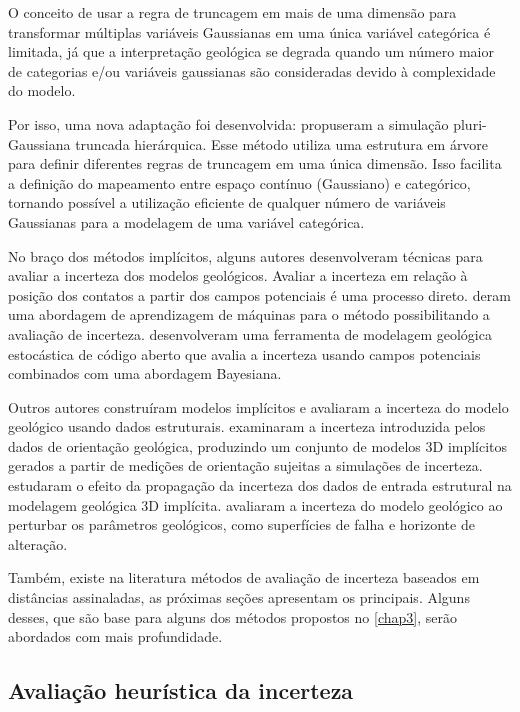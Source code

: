 O conceito de usar a regra de truncagem em mais de uma dimensão para transformar múltiplas variáveis Gaussianas em uma única variável categórica é limitada, já que a interpretação geológica se degrada quando um número maior de categorias e/ou variáveis gaussianas são consideradas devido à complexidade do modelo.

Por isso, uma nova adaptação foi desenvolvida:  propuseram a simulação pluri-Gaussiana truncada hierárquica. Esse método utiliza uma estrutura em árvore para definir diferentes regras de truncagem em uma única dimensão. Isso facilita a definição do mapeamento entre espaço contínuo (Gaussiano) e categórico, tornando possível a utilização eficiente de qualquer número de variáveis Gaussianas para a modelagem de uma variável categórica.

No braço dos métodos implícitos, alguns autores desenvolveram técnicas para avaliar a incerteza dos modelos geológicos. Avaliar a incerteza em relação à posição dos contatos a partir dos campos potenciais é uma  processo direto.  deram uma abordagem de aprendizagem de máquinas para o método possibilitando a avaliação de incerteza.  desenvolveram uma ferramenta de modelagem geológica estocástica de código aberto que avalia a incerteza usando campos potenciais combinados com uma abordagem Bayesiana.

Outros autores construíram modelos implícitos e avaliaram a incerteza do modelo geológico usando dados estruturais.  examinaram a incerteza introduzida pelos dados de orientação geológica, produzindo um conjunto de modelos 3D implícitos gerados a partir de medições de orientação sujeitas a simulações de incerteza.  estudaram o efeito da propagação da incerteza dos dados de entrada estrutural na modelagem geológica 3D implícita.  avaliaram a incerteza do modelo geológico ao perturbar os parâmetros geológicos, como superfícies de falha e horizonte de alteração.

Também, existe na literatura métodos de avaliação de incerteza baseados em distâncias assinaladas, as próximas seções apresentam os principais. Alguns desses, que são base para alguns dos métodos propostos no \autoref{chap3}, serão abordados com mais profundidade.

\subsection{Avaliação heurística da incerteza}\label{heuristic}

